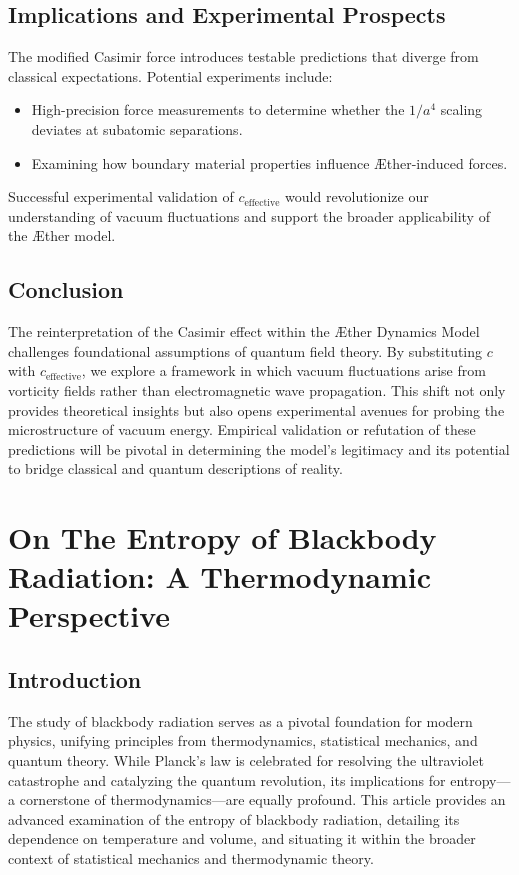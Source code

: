 \documentclass[a4paper,10pt]{article}
\begin{document}
    \subsection*{Implications and Experimental Prospects}
    The modified Casimir force introduces testable predictions that diverge from classical expectations. Potential experiments include:
    \begin{itemize}
        \item High-precision force measurements to determine whether the $1/a^4$ scaling deviates at subatomic separations.
        \item Examining how boundary material properties influence Æther-induced forces.
    \end{itemize}
    Successful experimental validation of $c_\text{effective}$ would revolutionize our understanding of vacuum fluctuations and support the broader applicability of the Æther model.

    \subsection*{Conclusion}
    The reinterpretation of the Casimir effect within the Æther Dynamics Model challenges foundational assumptions of quantum field theory. By substituting $c$ with $c_\text{effective}$, we explore a framework in which vacuum fluctuations arise from vorticity fields rather than electromagnetic wave propagation. This shift not only provides theoretical insights but also opens experimental avenues for probing the microstructure of vacuum energy. Empirical validation or refutation of these predictions will be pivotal in determining the model's legitimacy and its potential to bridge classical and quantum descriptions of reality.


    

 \section{On The Entropy of Blackbody Radiation: A Thermodynamic Perspective}

 \subsection*{Introduction}
 The study of blackbody radiation serves as a pivotal foundation for modern physics, unifying principles from thermodynamics, statistical mechanics, and quantum theory. While Planck's law is celebrated for resolving the ultraviolet catastrophe and catalyzing the quantum revolution, its implications for entropy—a cornerstone of thermodynamics—are equally profound. This article provides an advanced examination of the entropy of blackbody radiation, detailing its dependence on temperature and volume, and situating it within the broader context of statistical mechanics and thermodynamic theory.
\end{document}

